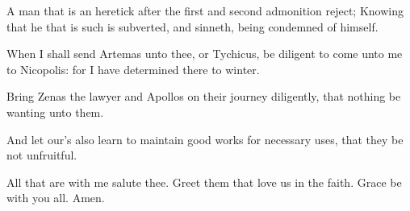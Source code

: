 \Verse A man that is an heretick after the first and second admonition reject; \Verse Knowing that he that is such is subverted, and sinneth, being condemned of himself.

\Verse When I shall send Artemas unto thee, or Tychicus, be diligent to come unto me to Nicopolis: for I have determined there to winter.

\Verse Bring Zenas the lawyer and Apollos on their journey diligently, that nothing be wanting unto them.

\Verse And let our's also learn to maintain good works for necessary uses, that they be not unfruitful.

\Verse All that are with me salute thee. Greet them that love us in the faith. Grace be with you all. Amen.

